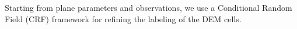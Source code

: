 Starting from plane parameters and observations, we use a Conditional Random
Field (CRF) framework for refining the labeling of the DEM cells.
